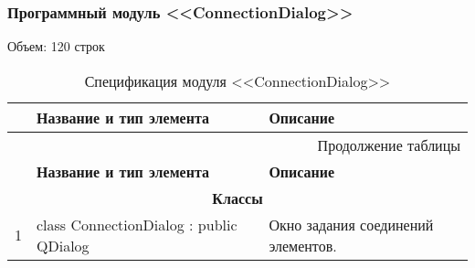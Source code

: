 \subsubsection*{Программный модуль <<ConnectionDialog>>}
Объем: 120 строк

\small
\singlespacing
\begin{longtable}[h]{|p{}|p{}|p{}|}
  \caption{Спецификация модуля <<ConnectionDialog>>}
	\\ \hline
	  \textbf{\No}                  &
	  \textbf{Название и тип элемента}  &
	  \textbf{Описание}
	\\ \hline
  \endfirsthead

  \multicolumn{3}{r}{Продолжение таблицы \thetable{}}
  \\ \hline
	  \textbf{\No}                  &
	  \textbf{Название и тип элемента}  &
	  \textbf{Описание}
	\\ \hline
  \endhead

  \multicolumn{3}{|c|}{\textbf{Классы}} \\
  \hline
  1 & class ConnectionDialog : public QDialog & Окно задания соединений элементов. \\ \hline
\end{longtable}
\normalsize
\onehalfspacing


